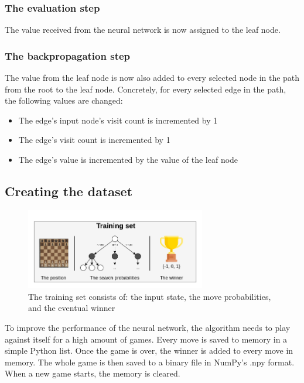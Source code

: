\documentclass{article}
\begin{document}
\subsubsection{The evaluation step}

The value received from the neural network is now assigned to the leaf node.

\subsubsection{The backpropagation step}

The value from the leaf node is now also added to every selected node in the path from the root to the leaf node.
Concretely, for every selected edge in the path, the following values are changed:

\begin{itemize}
    \item The edge's input node's visit count is incremented by 1
    \item The edge's visit count is incremented by 1
    \item The edge's value is incremented by the value of the leaf node
\end{itemize}


\subsection{Creating the dataset}


\begin{figure}[H]
    \centering
    \includegraphics[width=0.7\textwidth]{img/trainingset.png}
    \caption{The training set consists of: the input state, the move probabilities, and the eventual winner}
\end{figure}

To improve the performance of the neural network, the algorithm needs to play against itself for a high amount of games.
Every move is saved to memory in a simple Python list. Once the game is over, the winner is added to every move in memory.
The whole game is then saved to a binary file in NumPy's .npy format. 
When a new game starts, the memory is cleared.
\end{document}
